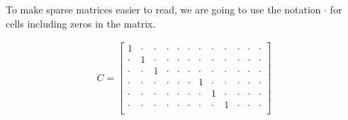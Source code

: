 \documentclass{article}
\begin{document}

To make sparse matrices easier to read, we are going to use the notation \(\cdot\) for cells including zeros in the matrix.

\begin{align}
    C =
    \begin{bmatrix}
        1     & \cdot & \cdot & \cdot & \cdot & \cdot & \cdot & \cdot & \cdot & \cdot & \cdot & \cdot \\%
        \cdot & 1     & \cdot & \cdot & \cdot & \cdot & \cdot & \cdot & \cdot & \cdot & \cdot & \cdot \\%
        \cdot & \cdot & 1     & \cdot & \cdot & \cdot & \cdot & \cdot & \cdot & \cdot & \cdot & \cdot \\%
        \cdot & \cdot & \cdot & \cdot & \cdot & \cdot & 1     & \cdot & \cdot & \cdot & \cdot & \cdot \\%
        \cdot & \cdot & \cdot & \cdot & \cdot & \cdot & \cdot &     1 & \cdot & \cdot & \cdot & \cdot \\%
        \cdot & \cdot & \cdot & \cdot & \cdot & \cdot & \cdot & \cdot & 1     & \cdot & \cdot & \cdot \\%
    \end{bmatrix}
\end{align}
\end{document}
